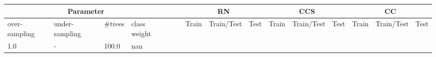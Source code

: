 \begin{table}[]
\tiny
\tabcolsep=0.11cm
\begin{tabularx}{\textwidth}{XXlllllllllllll@{}}
\toprule
\multicolumn{4}{c}{Parameter}                                                                                                                                                              & &                                                                     & \multicolumn{3}{c}{RN}                                                                                                                                                                         & \multicolumn{3}{c}{CCS}                                                                                                                                                                           & \multicolumn{3}{c}{CC}                                                                                                                                                                            \\ \midrule
over-\newline sampling                                                       & under-\newline sampling                                                       & \#trees                                                     & class weight          & &                                & Train                                                        & Train/Test                                                        & Test                                                        & Train                                                         & Train/Test                                                         & Test                                                         & Train                                                         & Train/Test                                                         & Test                                                         \\ \midrule
1.0 & - & 100.0 & nan &                                                              &                                                                   &                                                             &                                                               &                                                                    &                                                              &                                                               &                                                                    &                                                              \\

\end{tabularx}
\end{table}
